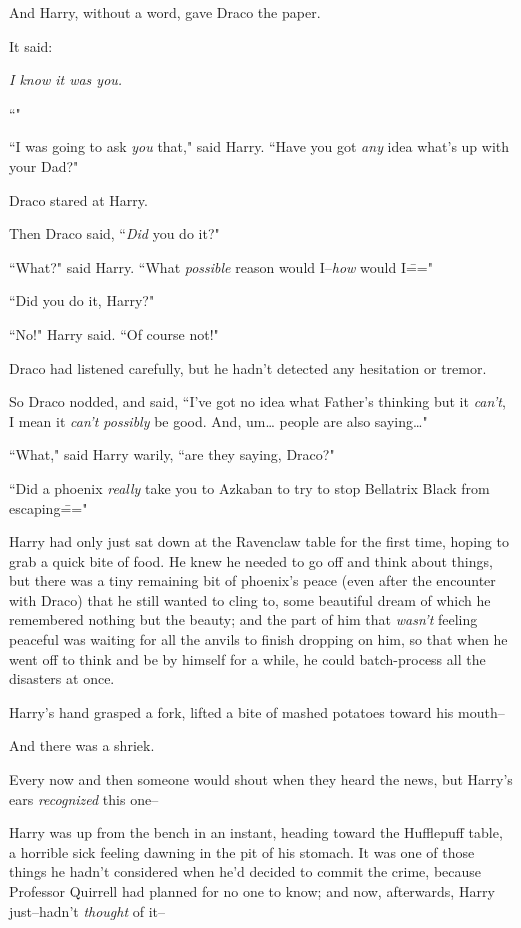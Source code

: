 And Harry, without a word, gave Draco the paper.

It said:

\emph{I know it was you.}

``\emph{}"

``I was going to ask \emph{you} that," said Harry. ``Have you got \emph{any} idea what's up with your Dad?"

Draco stared at Harry.

Then Draco said, ``\emph{Did} you do it?"

``What?" said Harry. ``What \emph{possible} reason would I\---\emph{how} would I\==="

``Did you do it, Harry?"

``No!" Harry said. ``Of course not!"

Draco had listened carefully, but he hadn't detected any hesitation or tremor.

So Draco nodded, and said, ``I've got no idea what Father's thinking but it \emph{can't}, I mean it \emph{can't possibly} be good. And, um{\ldots} people are also saying{\ldots}"

``What," said Harry warily, ``are they saying, Draco?"

``Did a phoenix \emph{really} take you to Azkaban to try to stop Bellatrix Black from escaping\==="


Harry had only just sat down at the Ravenclaw table for the first time, hoping to grab a quick bite of food. He knew he needed to go off and think about things, but there was a tiny remaining bit of phoenix's peace (even after the encounter with Draco) that he still wanted to cling to, some beautiful dream of which he remembered nothing but the beauty; and the part of him that \emph{wasn't} feeling peaceful was waiting for all the anvils to finish dropping on him, so that when he went off to think and be by himself for a while, he could batch-process all the disasters at once.

Harry's hand grasped a fork, lifted a bite of mashed potatoes toward his mouth\---

And there was a shriek.

Every now and then someone would shout when they heard the news, but Harry's ears \emph{recognized} this one\---

Harry was up from the bench in an instant, heading toward the Hufflepuff table, a horrible sick feeling dawning in the pit of his stomach. It was one of those things he hadn't considered when he'd decided to commit the crime, because Professor Quirrell had planned for no one to know; and now, afterwards, Harry just\---hadn't \emph{thought} of it\---

